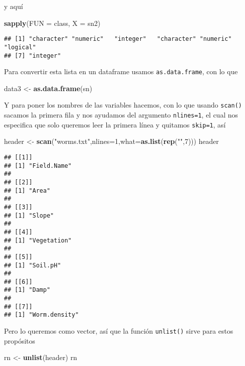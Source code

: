 \documentclass[]{article}
\newenvironment{Shaded}{\begin{snugshade}}{\end{snugshade}}
\newcommand{\KeywordTok}[1]{\textcolor[rgb]{0.13,0.29,0.53}{\textbf{#1}}}
\newcommand{\DataTypeTok}[1]{\textcolor[rgb]{0.13,0.29,0.53}{#1}}
\newcommand{\DecValTok}[1]{\textcolor[rgb]{0.00,0.00,0.81}{#1}}
\newcommand{\StringTok}[1]{\textcolor[rgb]{0.31,0.60,0.02}{#1}}
\newcommand{\NormalTok}[1]{#1}
\begin{document}
y aquí

\begin{Shaded}
\begin{Highlighting}[]
\KeywordTok{sapply}\NormalTok{(}\DataTypeTok{FUN =}\NormalTok{ class, }\DataTypeTok{X =}\NormalTok{ sn2)}
\end{Highlighting}
\end{Shaded}

\begin{verbatim}
## [1] "character" "numeric"   "integer"   "character" "numeric"   "logical"  
## [7] "integer"
\end{verbatim}

Para convertir esta lista en un dataframe usamos \texttt{as.data.frame},
con lo que

\begin{Shaded}
\begin{Highlighting}[]
\NormalTok{data3 <-}\StringTok{ }\KeywordTok{as.data.frame}\NormalTok{(sn)}
\end{Highlighting}
\end{Shaded}

Y para poner los nombres de las variables hacemos, con lo que usando
\texttt{scan()} sacamos la primera fila y nos ayudamos del argumento
\texttt{nlines=1}, el cual nos especifica que solo queremos leer la
primera línea y quitamos \texttt{skip=1}, así

\begin{Shaded}
\begin{Highlighting}[]
\NormalTok{header <-}\StringTok{ }\KeywordTok{scan}\NormalTok{(}\StringTok{"worms.txt"}\NormalTok{,}\DataTypeTok{nlines=}\DecValTok{1}\NormalTok{,}\DataTypeTok{what=}\KeywordTok{as.list}\NormalTok{(}\KeywordTok{rep}\NormalTok{(}\StringTok{""}\NormalTok{,}\DecValTok{7}\NormalTok{)))}
\NormalTok{header}
\end{Highlighting}
\end{Shaded}

\begin{verbatim}
## [[1]]
## [1] "Field.Name"
## 
## [[2]]
## [1] "Area"
## 
## [[3]]
## [1] "Slope"
## 
## [[4]]
## [1] "Vegetation"
## 
## [[5]]
## [1] "Soil.pH"
## 
## [[6]]
## [1] "Damp"
## 
## [[7]]
## [1] "Worm.density"
\end{verbatim}

Pero lo queremos como vector, así que la función \texttt{unlist()} sirve
para estos propósitos

\begin{Shaded}
\begin{Highlighting}[]
\NormalTok{rn <-}\StringTok{ }\KeywordTok{unlist}\NormalTok{(header)}
\NormalTok{rn}
\end{Highlighting}
\end{Shaded}
\end{document}
